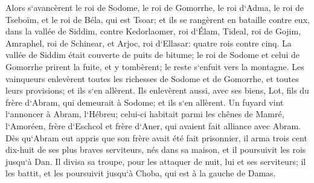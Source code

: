 \verse Alors s`avancèrent le roi de Sodome, le roi de Gomorrhe, le roi d`Adma, le roi de Tseboïm, et le roi de Béla, qui est Tsoar; et ils se rangèrent en bataille contre eux, dans la vallée de Siddim, 
\verse contre Kedorlaomer, roi d`Élam, Tideal, roi de Gojim, Amraphel, roi de Schinear, et Arjoc, roi d`Ellasar: quatre rois contre cinq. 
\verse La vallée de Siddim était couverte de puits de bitume; le roi de Sodome et celui de Gomorrhe prirent la fuite, et y tombèrent; le reste s`enfuit vers la montagne. 
\verse Les vainqueurs enlevèrent toutes les richesses de Sodome et de Gomorrhe, et toutes leurs provisions; et ils s`en allèrent. 
\verse Ils enlevèrent aussi, avec ses biens, Lot, fils du frère d`Abram, qui demeurait à Sodome; et ils s`en allèrent. 
\verse Un fuyard vint l`annoncer à Abram, l`Hébreu; celui-ci habitait parmi les chênes de Mamré, l`Amoréen, frère d`Eschcol et frère d`Aner, qui avaient fait alliance avec Abram. 
\verse Dès qu`Abram eut appris que son frère avait été fait prisonnier, il arma trois cent dix-huit de ses plus braves serviteurs, nés dans sa maison, et il poursuivit les rois jusqu`à Dan. 
\verse Il divisa sa troupe, pour les attaquer de nuit, lui et ses serviteurs; il les battit, et les poursuivit jusqu`à Choba, qui est à la gauche de Damas. 
